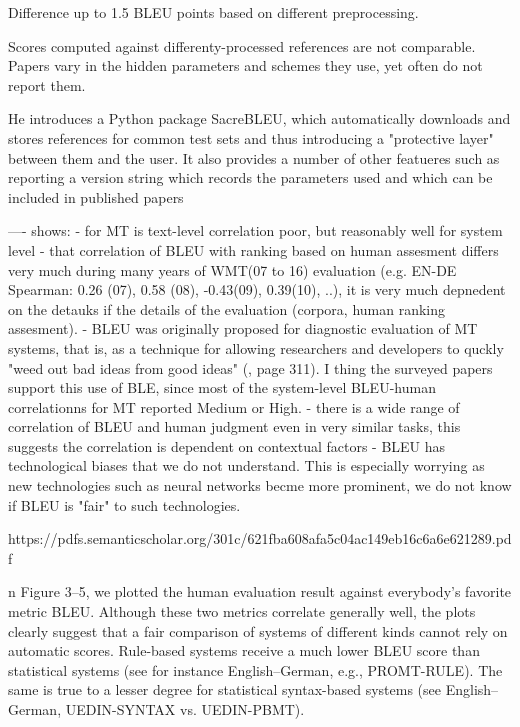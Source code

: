 \documentclass[11pt]{article}
\begin{document}
 Difference up to 1.5 BLEU points based on different preprocessing.
 
 
 Scores computed against differenty-processed references are not comparable. Papers vary in the hidden parameters and schemes they use, yet often do not report them.
 
 He introduces a Python package SacreBLEU, which automatically downloads and stores references for common test sets and thus introducing a "protective layer" between them and the user. It also provides a number of other featueres such as reporting a version string which records the parameters used and which can be included in published papers

----
\cite{reiter-2018-structured} shows:
- for MT is text-level correlation poor, but reasonably well for system level
- that correlation of BLEU with ranking based on human assesment differs very much during many years of WMT(07 to 16) evaluation (e.g. EN-DE Spearman: 0.26 (07), 0.58 (08), -0.43(09), 0.39(10), ..), it is very much depnedent on the detauks if the details of the evaluation (corpora, human ranking assesment).
- BLEU was originally proposed for diagnostic evaluation of MT systems, that is, as a technique for allowing researchers and developers to quckly "weed out bad ideas from good ideas" (\cite{bleu}, page 311). I thing the surveyed papers support this use of BLE, since most of the system-level BLEU-human correlationns for MT reported Medium or High.
- there is a wide range of correlation of BLEU and human judgment even in very similar tasks, this suggests the correlation is dependent on contextual factors
- BLEU has technological biases that we do not understand. This is especially worrying as new technologies such as neural networks becme more prominent, we do not know if BLEU is "fair" to such technologies. 

https://pdfs.semanticscholar.org/301c/621fba608afa5c04ac149eb16c6a6e621289.pdf

\cite{callison2006re} 


\cite{wmt16} n Figure 3–5, we plotted the human evaluation result against everybody’s favorite metric BLEU. Although these two metrics correlate generally well, the plots clearly suggest that a fair comparison of systems of different kinds cannot rely on automatic scores. Rule-based systems receive a much lower BLEU score than statistical systems (see for instance English–German, e.g., PROMT-RULE). The same is true to a lesser degree for statistical syntax-based systems (see English– German, UEDIN-SYNTAX vs. UEDIN-PBMT).
\end{document}
